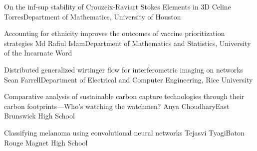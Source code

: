 \begin{postersPF}
\item\poster %
{On the inf-sup stability of Crouzeix-Raviart Stokes Elements in 3D}
{Celine Torres}{Department of Mathematics, University of Houston}

\item\poster %
{Accounting for ethnicity improves the outcomes of  vaccine prioritization strategies}
{Md Rafiul Islam}{Department of Mathematics and Statistics, University of the Incarnate Word}

\item\poster %
{Distributed generalized wirtinger flow for interferometric imaging on networks}
{Sean Farrell}{Department of Electrical and Computer Engineering, Rice University}

\end{postersPF}


\begin{postersPH}

\item\poster %
{Comparative analysis of sustainable carbon capture technologies through their carbon footprints---Who's watching the watchmen?}
{Anya Choudhary}{East Brunswick High School}

\item\poster %
{Classifying melanoma using convolutional neural networks}
{Tejasvi Tyagi}{Baton Rouge Magnet High School}

\end{postersPH}


